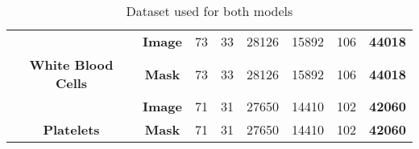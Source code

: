 \begin{table}[ht]
{\begin{tabular}{|cc|c|c|c|c|c|c|}
\multicolumn{1}{|c|}{{ }}                                             & { \textbf{Image}} & { 73}                                                              & { 33}                                                             & { 28126}                                                          & { 15892}                                                         & { 106}                                                             & { \textbf{44018}}                                                 \\ \cline{2-8} 
\multicolumn{1}{|c|}{\multirow{-2}{*}{{ \textbf{White Blood Cells}}}} & { \textbf{Mask}}  & { 73}                                                              & { 33}                                                             & { 28126}                                                          & { 15892}                                                         & { 106}                                                             & { \textbf{44018}}                                                 \\ \hline
\multicolumn{1}{|c|}{{ }}                                             & { \textbf{Image}} & { 71}                                                              & { 31}                                                             & { 27650}                                                          & { 14410}                                                         & { 102}                                                             & { \textbf{42060}}                                                 \\ \cline{2-8} 
\multicolumn{1}{|c|}{\multirow{-2}{*}{{ \textbf{Platelets}}}}         & { \textbf{Mask}}  & { 71}                                                              & { 31}                                                             & { 27650}                                                          & { 14410}                                                         & { 102}                                                             & { \textbf{42060}}                                                 \\ \hline
\end{tabular}%
}
\caption{Dataset used for both models}
\label{table:total_tiles}
\end{table}
